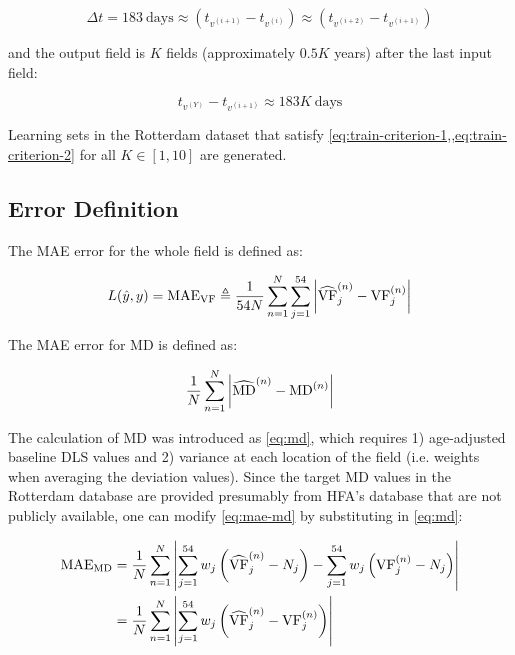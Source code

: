 \begin{equation} \label{eq:train-criterion-1}
\Delta t = 183~\textrm{days} \approx (t_{v^{(i+1)}} - t_{v^{(i)}}) \approx (t_{v^{(i+2)}} - t_{v^{(i+1)}})
\end{equation}

and the output field is $K$ fields (approximately $0.5K$ years) after the last input field:

\begin{equation} \label{eq:train-criterion-2}
t_{v^{(Y)}} - t_{v^{(i+1)}} \approx 183K~\textrm{days}
\end{equation}

Learning sets in the Rotterdam dataset that satisfy \cref{eq:train-criterion-1,,eq:train-criterion-2} for all $K\in[1, 10]$ are generated.

\subsection{Error Definition}

The \ac{MAE} error for the whole field is defined as:

\begin{equation}
L(\hat{y}, y) = \textrm{MAE}_{\textrm{VF}} \triangleq 
\frac{1}{54N} \sum_{n=1}^N \sum_{j=1}^{54} \left|  \widehat{\textrm{VF}}_j^{(n)} - {\textrm{VF}}_j^{(n)}  \right|
\end{equation}

The \ac{MAE} error for \ac{MD} is defined as:

\begin{equation} \label{eq:mae-md}
\frac{1}{N} \sum_{n=1}^N \left|  \widehat{\textrm{MD}}^{(n)} - {\textrm{MD}}^{(n)}  \right|
\end{equation}

The calculation of \ac{MD} was introduced as \cref{eq:md}, which requires 1) age-adjusted baseline \ac{DLS} values and 2) variance at each location of the field (i.e. weights when averaging the deviation values). Since the target \ac{MD} values in the Rotterdam database are provided presumably from \ac{HFA}'s database that are not publicly available, one can modify \cref{eq:mae-md} by substituting in \cref{eq:md}:

\begin{align}
\textrm{MAE}_{\textrm{MD}} &=
\frac{1}{N} \sum_{n=1}^N \left| 
\sum_{j=1}^{54} w_j \left( \widehat{\textrm{VF}}_j^{(n)} - N_j \right) - 
\sum_{j=1}^{54} w_j \left( {\textrm{VF}}_j^{(n)} - N_j \right)  \right| \\
&=
\frac{1}{N} \sum_{n=1}^N \left| 
\sum_{j=1}^{54} w_j \left( \widehat{\textrm{VF}}_j^{(n)} - \textrm{VF}_j^{(n)} \right) \right|
\end{align}

